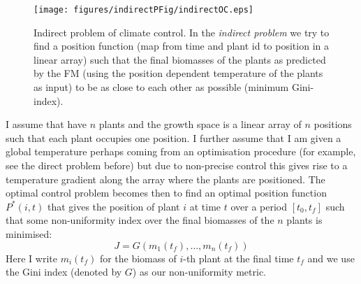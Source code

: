 
\begin{figure}[tb]
\centering
\texttt{[image: figures/indirectPFig/indirectOC.eps]}
\caption{Indirect problem of climate control. In the \emph{indirect problem} we
  try to find a position function (map from time and plant id to position in a
  linear array) such that the final biomasses of the plants as predicted by the
  FM (using the position dependent temperature of the plants as input) to be as
  close to each other as possible (minimum Gini-index).}
\label{fig:indirectP}
\end{figure}

I assume that have $n$ plants and the growth space is a linear array of $n$
positions such that each plant occupies one position. I further assume that I
am given a global temperature perhaps coming from an optimisation procedure
(for example, see the direct problem before) but due to non-precise control this
gives rise to a temperature gradient along the array where the plants are
positioned. The optimal control problem becomes then to find an optimal position
function $P^*(i, t)$ that gives the position of plant $i$ at time $t$ over a
period $[t_0, t_f]$ such that some non-uniformity index over the final biomasses
of the $n$ plants is minimised:
$$
J = G(m_1(t_f), \dots, m_n(t_f))
$$
Here I write $m_i(t_f)$ for the biomass of $i$-th plant at the final time $t_f$
and we use the Gini index (denoted by $G$) as our non-uniformity metric.

